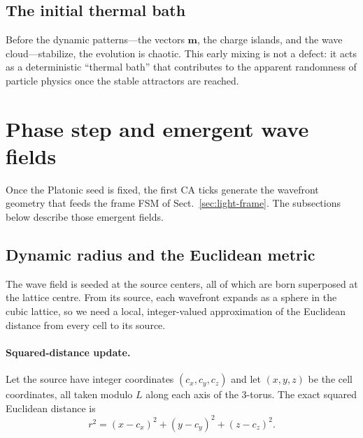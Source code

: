 \documentclass{ijuc}
\begin{document}
\subsection{The initial thermal bath}

Before the dynamic patterns---the vectors $\boldsymbol{m}$, the charge islands, and the wave cloud---stabilize, the evolution is chaotic.  This early mixing is not a defect: it acts as a deterministic ``thermal bath'' that contributes to the apparent randomness of particle physics once the stable attractors are reached.


\section{Phase step and emergent wave fields}\label{sec:phase-step}

Once the Platonic seed is fixed, the first CA ticks generate the wavefront geometry that feeds the frame FSM of Sect.~\ref{sec:light-frame}.  The subsections below describe those emergent fields.

\subsection{Dynamic radius and the Euclidean metric}

The wave field is seeded at the source centers, all of which are born superposed at the lattice centre.  From its source, each wavefront expands as a sphere in the cubic lattice, so we need a local, integer-valued approximation of the Euclidean distance from every cell to its source.

\paragraph{Squared-distance update.}
Let the source have integer coordinates $(c_{x},c_{y},c_{z})$ and let $(x,y,z)$ be the cell coordinates, all taken modulo $L$ along each axis of the 3-torus.  The exact squared Euclidean distance is
\[
r^{2}=(x-c_{x})^{2}+(y-c_{y})^{2}+(z-c_{z})^{2}.
\]
\end{document}
